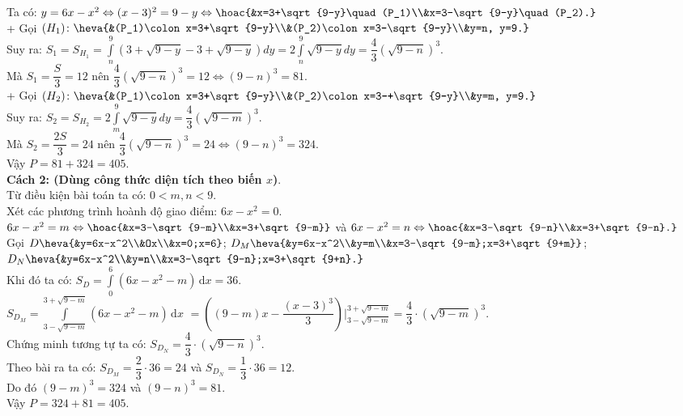 \begin{vd}
{		Ta có: $y=6x-x^2\Leftrightarrow(x-3)^2=9-y\Leftrightarrow\hoac{&x=3+\sqrt{9-y}\quad(P_1)\\&x=3-\sqrt{9-y}\quad(P_2).}$ \\
		+ Gọi $(H_1)\colon\heva{&(P_1)\colon x=3+\sqrt{9-y}\\&(P_2)\colon x=3-\sqrt{9-y}\\&y=n, y=9.}$ \\
		Suy ra: $S_1=S_{H_1}=\displaystyle\int\limits_n^9\left(3+\sqrt{9-y}-3+\sqrt{9-y}\right)dy=2\displaystyle\int\limits_n^9\sqrt{9-y}dy=\dfrac{4}{3}(\sqrt{9-n})^3$.\\
		Mà $S_1=\dfrac{S}{3}=12$ nên $\dfrac{4}{3}(\sqrt{9-n})^3=12\Leftrightarrow(9-n)^3=81$.\\
		+ Gọi $(H_2)\colon\heva{&(P_1)\colon x=3+\sqrt{9-y}\\&(P_2)\colon x=3-+\sqrt{9-y}\\&y=m, y=9.}$ \\
		Suy ra: $S_2=S_{H_2}=2\displaystyle\int\limits_m^9\sqrt{9-y}dy=\dfrac{4}{3}(\sqrt{9-m})^3$.\\
		Mà $S_2=\dfrac{2S}{3}=24$ nên $\dfrac{4}{3}(\sqrt{9-n})^3=24\Leftrightarrow(9-n)^3=324$.\\
		Vậy $P=81+324=405$.\\
		\textbf{	Cách 2: (Dùng công thức diện tích theo biến $x$)}.\\
		Từ điều kiện bài toán ta có: $0<m,n<9$.\\
		Xét các phương trình hoành độ giao điểm: $6x-x^2=0$.\\
		$6x-x^2=m\Leftrightarrow\hoac{&x=3-\sqrt{9-m}\\&x=3+\sqrt{9-m}}$ và $6x-x^2=n\Leftrightarrow\hoac{&x=3-\sqrt{9-n}\\&x=3+\sqrt{9-n}.}$ \\
		Gọi $D\heva{&y=6x-x^2\\&Ox\\&x=0;x=6}$; $D_M\heva{&y=6x-x^2\\&y=m\\&x=3-\sqrt{9-m};x=3+\sqrt{9+m}}$; $D_N\heva{&y=6x-x^2\\&y=n\\&x=3-\sqrt{9-n};x=3+\sqrt{9+n}.}$ \\
		Khi đó ta có: 
		$S_{D}=\displaystyle\int\limits_{0}^{6}\left(6x-x^2-m\right)\mathrm{\,d}x=36$.\\
		$S_{D_M}=\displaystyle\int\limits_{3-\sqrt{9-m}}^{3+\sqrt{9-m}}\left(6x-x^2-m\right)\mathrm{\,d}x$  $=\left((9-m)x-\dfrac{(x-3)^3}{3}\right)\bigg|_{3-\sqrt{9-m}}^{3+\sqrt{9-m}} =\dfrac{4}{3}\cdot (\sqrt{9-m})^3$.\\
		Chứng minh tương tự ta có: $S_{D_N}=\dfrac{4}{3}\cdot (\sqrt{9-n})^3$.\\
		Theo bài ra ta có: $S_{D_M}=\dfrac{2}{3}\cdot 36=24$ và $S_{D_N}=\dfrac{1}{3}\cdot 36=12$.\\
		Do đó $(9-m)^3=324$ và $(9-n)^3=81$.\\
		Vậy $P=324+81=405$.}
\end{vd}
